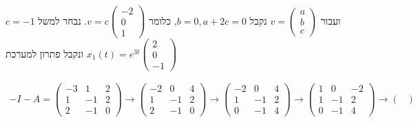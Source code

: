 \documentclass{article}
\begin{document}
ועבור $v=\begin{pmatrix}
        a \\
        b \\
        c
    \end{pmatrix}$ נקבל $b=0, a+2c=0$, כלומר $v=c\begin{pmatrix}
        -2 \\
        0  \\
        1
    \end{pmatrix}$. נבחר למשל $c=-1$ ונקבל פתרון למערכת $x_1(t)=e^{3t}\begin{pmatrix}
        2 \\
        0 \\
        -1
    \end{pmatrix}$

\begin{align*}
    -I-A=\begin{pmatrix}
             -3 & 1  & 2 \\
             1  & -1 & 2 \\
             2  & -1 & 0
         \end{pmatrix} \rightarrow \begin{pmatrix}
                                       -2 & 0  & 4 \\
                                       1  & -1 & 2 \\
                                       2  & -1 & 0
                                   \end{pmatrix} \rightarrow \begin{pmatrix}
                                                                 -2 & 0  & 4 \\
                                                                 1  & -1 & 2 \\
                                                                 0  & -1 & 4
                                                             \end{pmatrix} \rightarrow \begin{pmatrix}
                                                                                           1 & 0  & -2 \\
                                                                                           1 & -1 & 2  \\
                                                                                           0 & -1 & 4
                                                                                       \end{pmatrix}\rightarrow \begin{pmatrix}

\end{pmatrix}
\end{align*}
\end{document}
